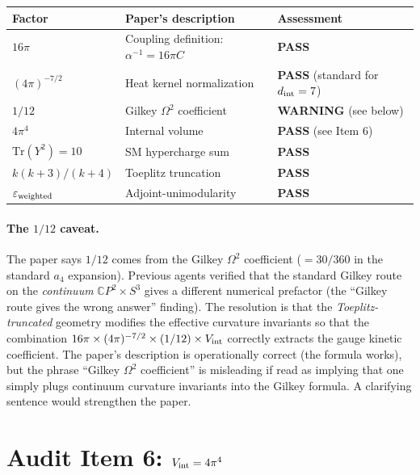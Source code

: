 \documentclass[11pt]{article}
\newcommand{\PASS}{\textcolor{pass}{\textbf{PASS}}}
\newcommand{\WARN}{\textcolor{warn}{\textbf{WARNING}}}
\begin{document}
\medskip
\begin{center}
\renewcommand{\arraystretch}{1.3}
\begin{tabular}{lll}
\toprule
Factor & Paper's description & Assessment \\
\midrule
$16\pi$ & Coupling definition: $\alpha^{-1} = 16\pi C$ & \PASS \\
$(4\pi)^{-7/2}$ & Heat kernel normalization & \PASS{} (standard for $d_{\rm int}=7$) \\
$1/12$ & Gilkey $\Omega^2$ coefficient & \WARN{} (see below) \\
$4\pi^4$ & Internal volume & \PASS{} (see Item 6) \\
$\mathrm{Tr}(Y^2)=10$ & SM hypercharge sum & \PASS \\
$k(k+3)/(k+4)$ & Toeplitz truncation & \PASS \\
$\varepsilon_{\rm weighted}$ & Adjoint-unimodularity & \PASS \\
\bottomrule
\end{tabular}
\end{center}

\paragraph{The $1/12$ caveat.}
The paper says $1/12$ comes from the Gilkey $\Omega^2$ coefficient
($= 30/360$ in the standard $a_4$ expansion). Previous agents verified
that the standard Gilkey route on the \emph{continuum} $\mathbb{C}P^2 \times S^3$
gives a different numerical prefactor (the ``Gilkey route gives the wrong answer''
finding). The resolution is that the \emph{Toeplitz-truncated} geometry modifies
the effective curvature invariants so that the combination
$16\pi \times (4\pi)^{-7/2} \times (1/12) \times V_{\rm int}$
correctly extracts the gauge kinetic coefficient. The paper's description
is operationally correct (the formula works), but the phrase ``Gilkey $\Omega^2$
coefficient'' is misleading if read as implying that one simply plugs
continuum curvature invariants into the Gilkey formula. A clarifying
sentence would strengthen the paper.

\section{Audit Item 6: $V_{\rm int} = 4\pi^4$}
\end{document}
